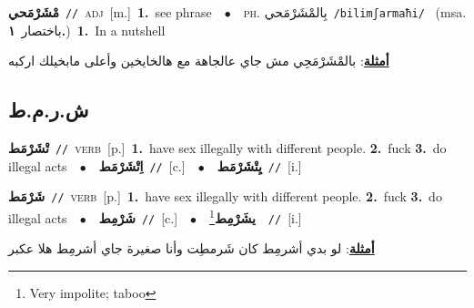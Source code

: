 \documentclass[10pt,a4paper,twoside]{article} %
\begin{document}
\begin{multicols}{2}
{\setlength\topsep{0pt}\textbf{\foreignlanguage{arabic}{مْشَرْمَحي}}\ {\color{gray}\texttt{//}\color{black}}\ \textsc{adj}\ [m.]\ \textbf{1.}~see phrase\ \ $\bullet$\ \ \textsc{ph.} \color{gray} \foreignlanguage{arabic}{بِالمْشَرْمَحي}\color{black}\ {\color{gray}\texttt{/{\sffamily bilimʃarmaħi}/}\color{black}}\ \color{gray} (msa. \foreignlanguage{arabic}{باختصار}~\foreignlanguage{arabic}{\textbf{١.}})\color{black}\ \textbf{1.}~In a nutshell\  \begin{flushright}\color{gray}\foreignlanguage{arabic}{\textbf{\underline{\foreignlanguage{arabic}{أمثلة}}}: بالمْشَرْمَحِي مش جاي عالجاهة مع هالخايخين وأعلى مابخيلك اركبه}\end{flushright}\color{black}} \vspace{2mm}

\vspace{-3mm}
\subsection*{\color{blue}\foreignlanguage{arabic}{ش.ر.م.ط}\color{blue}{}} 

{\setlength\topsep{0pt}\textbf{\foreignlanguage{arabic}{تْشَرْمَط}}\ {\color{gray}\texttt{//}\color{black}}\ \textsc{verb}\ [p.]\ \textbf{1.}~have sex illegally with different people.  \textbf{2.}~fuck  \textbf{3.}~do illegal acts\ \ $\bullet$\ \ \setlength\topsep{0pt}\textbf{\foreignlanguage{arabic}{اِتْشَرْمَط}}\ {\color{gray}\texttt{//}\color{black}}\ [c.]\ \ $\bullet$\ \ \setlength\topsep{0pt}\textbf{\foreignlanguage{arabic}{يِتْشَرْمَط}}\ {\color{gray}\texttt{//}\color{black}}\ [i.]\ } \vspace{2mm}

{\setlength\topsep{0pt}\textbf{\foreignlanguage{arabic}{شَرْمَط}}\ {\color{gray}\texttt{//}\color{black}}\ \textsc{verb}\ [p.]\ \textbf{1.}~have sex illegally with different people.  \textbf{2.}~fuck  \textbf{3.}~do illegal acts\ \ $\bullet$\ \ \setlength\topsep{0pt}\textbf{\foreignlanguage{arabic}{شَرْمِط}}\ {\color{gray}\texttt{//}\color{black}}\ [c.]\ \ $\bullet$\ \ \setlength\topsep{0pt}\textbf{\foreignlanguage{arabic}{يشَرْمِط}}\footnote{Very impolite; taboo}\ \ {\color{gray}\texttt{//}\color{black}}\ [i.]\  \begin{flushright}\color{gray}\foreignlanguage{arabic}{\textbf{\underline{\foreignlanguage{arabic}{أمثلة}}}: لو بدي أشرمِط كان شَرمطِت وأنا صغيرة جاي أشرمِط هلا عكبر}\end{flushright}\color{black}} \vspace{2mm}


\end{multicols}
\end{document}

